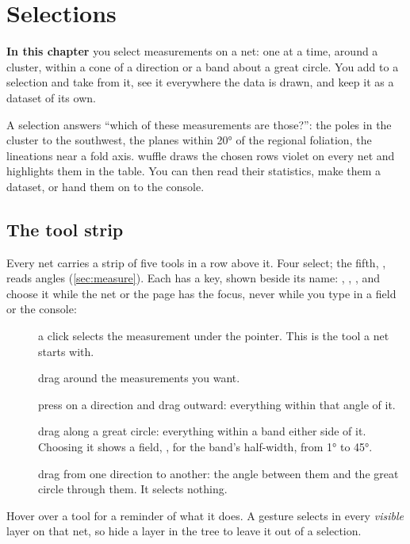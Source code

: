 \chapter{Selections}\label{ch:select}
\begin{goals}
\textbf{In this chapter} you select measurements on a net: one at a time, around a cluster, within a cone of
a direction or a band about a great circle. You add to a selection and take from it, see it everywhere the
data is drawn, and keep it as a dataset of its own.
\end{goals}

A selection answers \enquote{which of these measurements are those?}: the poles in the cluster to the
southwest, the planes within 20° of the regional foliation, the lineations near a fold axis. wuffle draws
the chosen rows violet on every net and highlights them in the table. You can then read their statistics,
make them a dataset, or hand them on to the console.

\section{The tool strip}\label{sec:select-tools}

Every net carries a strip of five tools in a row above it. Four select; the fifth, , reads
angles (\cref{sec:measure}). Each has a key, shown beside its name: , , ,  and
 choose it while the net or the page has the focus, never while you type in a field or the console:

\begin{description}
\item[] a click selects the measurement under the pointer. This is the tool a net starts with.
\item[] drag around the measurements you want.
\item[] press on a direction and drag outward: everything within that angle of it.
\item[] drag along a great circle: everything within a band either side of it. Choosing it shows
a field, , for the band's half-width, from 1° to 45°.
\item[] drag from one direction to another: the angle between them and the great circle
through them. It selects nothing.
\end{description}

Hover over a tool for a reminder of what it does. A gesture selects in every \emph{visible} layer on that
net, so hide a layer in the tree to leave it out of a selection.

